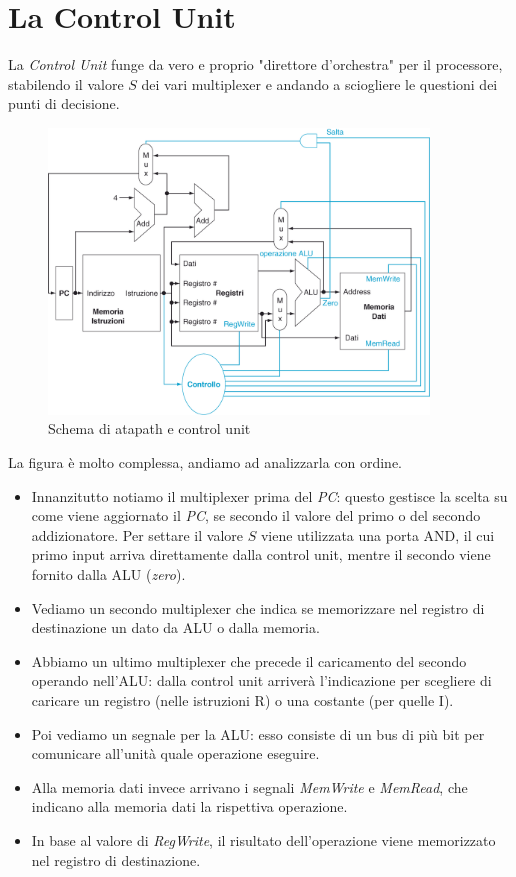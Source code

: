 \documentclass[class=book, crop=false, oneside]{standalone}
\begin{document}
\section{La Control Unit}
La \emph{Control Unit} funge da vero e proprio "direttore d'orchestra" per il processore, stabilendo il valore \(S\) dei vari multiplexer e andando a sciogliere le questioni dei punti di decisione.
\begin{figure}[H]
	\centering
	\includegraphics[width=0.9\textwidth,keepaspectratio]{datap_2}
	\caption{Schema di atapath e control unit}
\end{figure}
La figura è molto complessa, andiamo ad analizzarla con ordine.
\begin{itemize}
	\item Innanzitutto notiamo il multiplexer prima del \emph{PC}: questo gestisce la scelta su come viene aggiornato il \emph{PC}, se secondo il valore del primo o del secondo addizionatore. Per settare il valore \(S\) viene utilizzata una porta AND, il cui primo input arriva direttamente dalla control unit, mentre il secondo viene fornito dalla ALU (\emph{zero}).
	\item Vediamo un secondo multiplexer che indica se memorizzare nel registro di destinazione un dato da ALU o dalla memoria.
	\item Abbiamo un  ultimo multiplexer che precede il caricamento del secondo operando nell'ALU: dalla control unit arriverà l'indicazione per scegliere di caricare un registro (nelle istruzioni R) o una costante (per quelle I).
	\item Poi vediamo un segnale per la ALU: esso consiste di un bus di più bit per comunicare all'unità quale operazione eseguire.
	\item Alla memoria dati invece arrivano i segnali \emph{MemWrite} e \emph{MemRead}, che indicano alla memoria dati  la rispettiva operazione.
	\item In base al valore di \emph{RegWrite}, il risultato dell'operazione viene memorizzato nel registro di destinazione.
\end{itemize}
\end{document}
